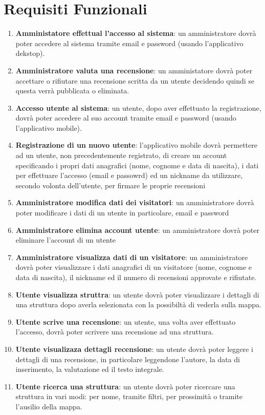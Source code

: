 \section{Requisiti Funzionali}
\begin{enumerate}
    \item  \textbf{Amministatore effettual l'accesso al sistema}: un amministratore dovrà poter accedere al sistema tramite email e password (usando l'applicativo dekstop).
    \item  \textbf{Amministratore valuta una recensione}: un amministatore dovrà poter accettare o rifiutare una recensione scritta da un utente decidendo quindi se questa verrà pubblicata o eliminata.
    \item \textbf{Accesso utente al sistema}: un utente, dopo aver effettuato la registrazione, dovrà poter accedere al suo account tramite email e password (usando l'applicativo mobile). 
    \item  \textbf{Registrazione di un nuovo utente}: l'applicativo mobile dovrà permettere ad un utente, non precedentemente registrato, di creare un account specificando 
    i propri dati anagrafici (nome, cognome e data di nascita), i dati per effettuare l'accesso (email e passowrd) ed un nickname da utilizzare, secondo volonta dell'utente, per firmare  
    le proprie recensioni
    \item \textbf{Amministratore modifica dati dei visitatori}: un amministratore dovrà poter modificare i dati di un utente in particolare, email e password
    \item \textbf{Amministratore elimina account utente}: un amministratore dovrà poter eliminare l'account di un utente
    \item \textbf{Amministratore visualizza dati di un visitatore}: un amministratore dovrà poter visualizzare i dati anagrafici di un visitatore (nome, cognome e data di nascita), 
    il nickname ed il numero di recensioni approvate e rifiutate.
    \item \textbf{Utente visualizza struttra}: un utente dovrà poter visualizzare i dettagli di una struttura dopo averla selezionata con la possibiltà di vederla sulla mappa.
    \item \textbf{Utente scrive una recensione}: un utente, una volta aver effettuato l'accesso, dovrà poter scrivere una recensione ad una struttura.
    \item \textbf{Utente visualizaza dettagli recensione}: un utente dovrà poter leggere i dettagli di una recensione, in particolare leggendone l'autore, la data di inserimento, la valutazione
    ed il testo integrale.
    \item \textbf{Utente ricerca una struttura}: un utente dovrà poter ricercare una struttura in vari modi: per nome, tramite filtri, per prossimità o tramite l'ausilio della mappa.
\end{enumerate}
